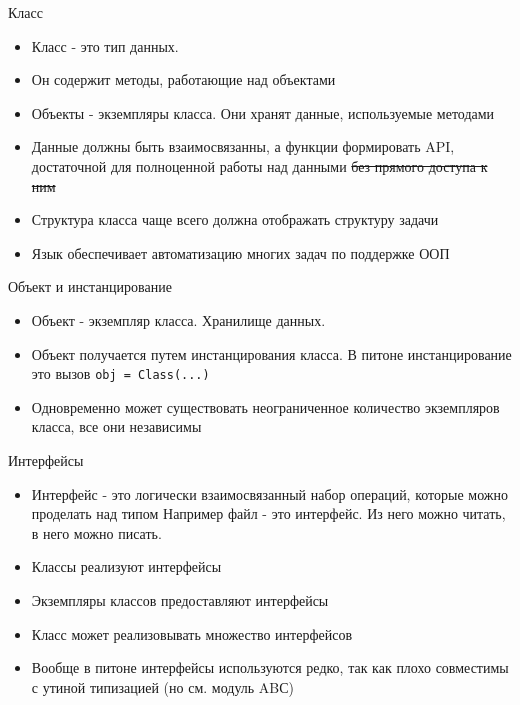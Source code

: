 \documentclass{article}
\begin{document}
\LARGE

\begin{center} Класс \end{center}
\begin{itemize}
    \item Класс - это тип данных.
    \item Он содержит методы, работающие над объектами
    \item Объекты - экземпляры класса. Они хранят данные, используемые методами
    \item Данные должны быть взаимосвязанны, а функции формировать API, 
            достаточной для полноценной работы над данными   \sout{без прямого 
            доступа к ним}
    \item Структура класса чаще всего должна отображать структуру задачи
    \item Язык обеспечивает автоматизацию многих задач по поддержке ООП
\end{itemize}
\newpage

\begin{center} Объект и инстанцирование \end{center}
\begin{itemize}
    \item Объект - экземпляр класса. Хранилище данных.
    \item Объект получается путем инстанцирования класса. 
          В питоне инстанцирование это вызов
               \lstinline!obj = Class(...)!
    \item Одновременно может существовать неограниченное количество 
          экземпляров класса, все они независимы
\end{itemize}
\newpage

\begin{center} Интерфейсы \end{center}
\begin{itemize}
    \item Интерфейс - это логически взаимосвязанный набор операций, 
          которые можно проделать над типом
          Например файл - это интерфейс. Из него можно читать, в него можно писать.
    \item Классы реализуют интерфейсы
    \item Экземпляры классов предоставляют интерфейсы
    \item Класс может реализовывать множество интерфейсов
    \item Вообще в питоне интерфейсы используются редко, 
          так как плохо совместимы с утиной типизацией (но см. модуль ABС)
\end{itemize}
\newpage
\end{document}
